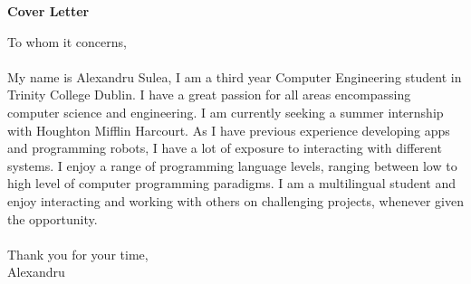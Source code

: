 \documentclass{article}
\begin{document}
\begin{titlepage}
	\begin{center}
	\huge{\bfseries Cover Letter}\\	
	[0mm]
	
	\end{center}
	






		
		
		
\vspace*{2cm}
		
		
		
\noindent To whom it concerns,\\
\\
	My name is Alexandru Sulea, I am a third year Computer Engineering student in Trinity College Dublin. I have a great passion for all areas encompassing computer science and engineering. I am currently seeking a summer internship with Houghton Mifflin Harcourt. As I have previous experience developing apps and programming robots, I have a lot of exposure to interacting with different systems. I enjoy a range of programming language levels, ranging between low to high level of computer programming paradigms. I am a multilingual student and enjoy interacting and working with others on challenging projects, whenever given the opportunity.\\
\\
Thank you for your time,\\
Alexandru\\

\end{titlepage}
\end{document}
